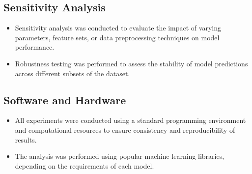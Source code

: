 \documentclass{article}
\begin{document}
\subsection{Sensitivity Analysis}
\begin{itemize}
   \item Sensitivity analysis was conducted to evaluate the impact of varying parameters, feature sets, or data preprocessing techniques on model performance.
   \item Robustness testing was performed to assess the stability of model predictions across different subsets of the dataset.
\end{itemize}

\subsection{Software and Hardware}
\begin{itemize}
   \item All experiments were conducted using a standard programming environment and computational resources to ensure consistency and reproducibility of results.
   \item The analysis was performed using popular machine learning libraries, depending on the requirements of each model.
\end{itemize}
\end{document}
